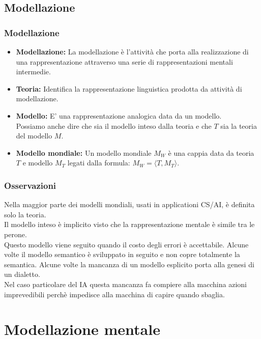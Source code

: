\documentclass[../main.tex]{subfiles}
\newcommand{\spazio}{\vspace{1em} \newline}
\begin{document}
    \section{Modellazione}
    \subsection{Modellazione}
    \begin{itemize}
        \item \textbf{Modellazione:} La modellazione è l'attività che porta alla realizzazione di una rappresentazione attraverso una serie di rappresentazioni mentali intermedie.
        \item \textbf{Teoria:} Identifica la rappresentazione linguistica prodotta da attività di modellazione.
        \item \textbf{Modello:} E' una rappresentazione analogica data da un modello.\\
            Possiamo anche dire che sia il modello inteso dalla teoria e che $T$ sia la teoria del modello $M$.
        \item \textbf{Modello mondiale:} Un modello mondiale $M_W$ è una cappia data da teoria $T$ e modello $M_T$ legati dalla formula: $M_W=\langle T, M_T \rangle$.
        \end{itemize}

        \subsection{Osservazioni}
        Nella maggior parte dei modelli mondiali, usati in applicationi CS/AI, è definita solo la teoria.\\
        Il modello inteso è implicito visto che la rappresentazione mentale è simile tra le perone.\\
        Questo modello viene seguito quando il costo degli errori è accettabile.
        \spazio
        Alcune volte il modello semantico è sviluppato in seguito e non copre totalmente la semantica.
        \spazio
        Alcune volte la mancanza di un modello esplicito porta alla genesi di un dialetto.\\
        Nel caso particolare del IA questa mancanza fa compiere alla macchina azioni imprevedibili perchè impedisce alla macchina di capire quando sbaglia.

    \chapter{Modellazione mentale}
\end{document}
